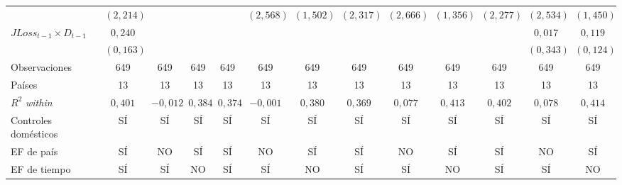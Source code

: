 \begin{landscape}
\begin{table}
\begin{adjustbox}{max width=\linewidth, max totalheight=\tablaalto\textheight}
\begin{tabular}{l c ccc ccc ccc cc}
 & $(2{,}214)$ &  &  &  & $(2{,}568)$ & $(1{,}502)$ & $(2{,}317)$ & $(2{,}666)$ & $(1{,}356)$ & $(2{,}277)$ & $(2{,}534)$ & $(1{,}450)$ \\
$JLoss_{t-1}\times D_{t-1}$ & $0{,}240$ &  &  &  &  &  &  &  &  &  & $0{,}017$ & $0{,}119$ \\
 & $(0{,}163)$ &  &  &  &  &  &  &  &  &  & $(0{,}343)$ & $(0{,}124)$ \\
\addlinespace
Observaciones & 649 & 649 & 649 & 649 & 649 & 649 & 649 & 649 & 649 & 649 & 649 & 649 \\
Países & 13 & 13 & 13 & 13 & 13 & 13 & 13 & 13 & 13 & 13 & 13 & 13 \\
$R^2$ \textit{within} & $0{,}401$ & $-0{,}012$ & $0{,}384$ & $0{,}374$ & $-0{,}001$ & $0{,}380$ & $0{,}369$ & $0{,}077$ & $0{,}413$ & $0{,}402$ & $0{,}078$ & $0{,}414$ \\
Controles domésticos & SÍ & SÍ & SÍ & SÍ & SÍ & SÍ & SÍ & SÍ & SÍ & SÍ & SÍ & SÍ \\
\midrule
EF de país & SÍ & NO & SÍ & SÍ & NO & SÍ & SÍ & NO & SÍ & SÍ & NO & SÍ \\
EF de tiempo & SÍ & SÍ & NO & SÍ & SÍ & NO & SÍ & SÍ & NO & SÍ & SÍ & NO \\
\bottomrule
\end{tabular}
\end{adjustbox}

\end{table}
\end{landscape}
